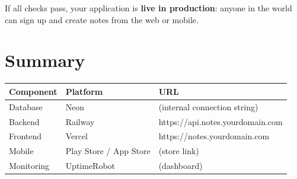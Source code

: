 \begin{checkpointbox}
If all checks pass, your application is \textbf{live in production}: anyone in the world can sign up and create notes from the web or mobile.
\end{checkpointbox}

\section*{Summary}

\begin{center}
\begin{tabularx}{\textwidth}{l l X}
\toprule
\textbf{Component} & \textbf{Platform} & \textbf{URL} \\
\midrule
Database & Neon & (internal connection string) \\
Backend & Railway & https://api.notes.yourdomain.com \\
Frontend & Vercel & https://notes.yourdomain.com \\
Mobile & Play Store / App Store & (store link) \\
Monitoring & UptimeRobot & (dashboard) \\
\bottomrule
\end{tabularx}
\end{center}

